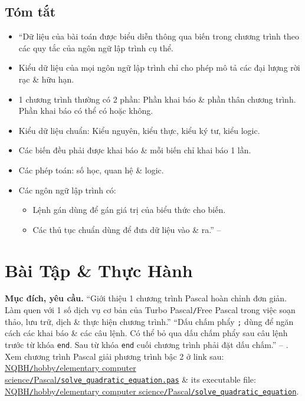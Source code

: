 \documentclass[oneside]{book}
\numberwithin{equation}{section}
\begin{document}
\subsection{Tóm tắt}
\begin{itemize}
	\item ``Dữ liệu của bài toán được biểu diễn thông qua biến trong chương trình theo các quy tắc của ngôn ngữ lập trình cụ thể.
	\item Kiểu dữ liệu của mọi ngôn ngữ lập trình chỉ cho phép mô tả các đại lượng rời rạc \& hữu hạn.
	\item 1 chương trình thường có 2 phần: Phần khai báo \& phần thân chương trình. Phần khai báo có thể có hoặc không.
	\item Kiểu dữ liệu chuẩn: Kiểu nguyên, kiểu thực, kiểu ký tư, kiểu logic.
	\item Các biến đều phải được khai báo \& mỗi biến chỉ khai báo 1 lần.
	\item Các phép toán: số học, quan hệ \& logic.
	\item Các ngôn ngữ lập trình có:
	\begin{itemize}
		\item Lệnh gán dùng để gán giá trị của biểu thức cho biến.
		\item Các thủ tục chuẩn dùng để đưa dữ liệu vào \& ra.'' -- \cite[p. 33]{SGK_Tin_Hoc_11}
	\end{itemize}
\end{itemize}

\section{Bài Tập \& Thực Hành}
\textbf{Mục đích, yêu cầu.} ``Giới thiệu 1 chương trình Pascal hoàn chỉnh đơn giản. Làm quen với 1 số dịch vụ cơ bản của Turbo Pascal\texttt{/}Free Pascal trong việc soạn thảo, lưu trữ, dịch \& thực hiện chương trình.'' ``Dấu chấm phẩy \texttt{;} dùng để ngăn cách các khai báo \& các câu lệnh. Có thể bỏ qua dấu chấm phẩy sau câu lệnh trước từ khóa \texttt{end}. Sau từ khóa \texttt{end} cuối chương trình phải đặt dấu chấm.'' -- \cite[p. 34]{SGK_Tin_Hoc_11}. Xem chương trình Pascal giải phương trình bậc 2 ở link sau: \href{https://github.com/NQBH/hobby/blob/master/elementary_computer_science/Pascal/solve_quadratic_equation.pas}{NQBH\texttt{/}hobby\texttt{/}elementary computer science\texttt{/}Pascal\texttt{/}\texttt{solve\_quadratic\_equation.pas}} \& its executable file: \href{https://github.com/NQBH/hobby/blob/master/elementary_computer_science/Pascal/solve_quadratic_equation}{NQBH\texttt{/}hobby\texttt{/}elementary computer science\texttt{/}Pascal\texttt{/}\texttt{solve\_quadratic\_equation}}.
\end{document}
